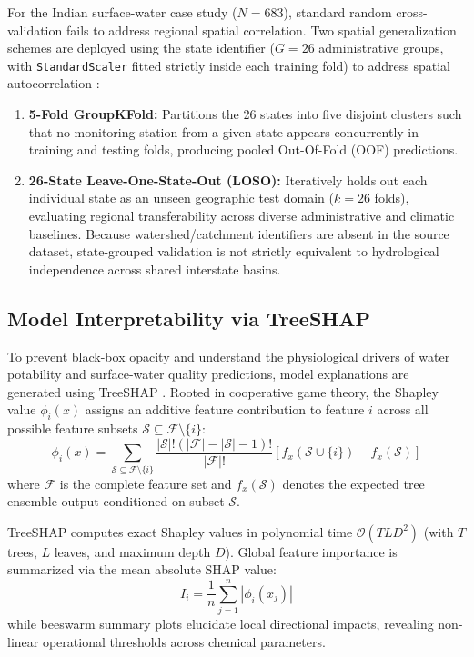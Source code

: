 \documentclass[pdflatex,sn-mathphys-num]{sn-jnl}%
\theoremstyle{thmstyleone}%
\theoremstyle{thmstyletwo}%
\theoremstyle{thmstylethree}%
\begin{document}
For the Indian surface-water case study ($N = 683$), standard random cross-validation fails to address regional spatial correlation. Two spatial generalization schemes are deployed using the state identifier ($G = 26$ administrative groups, with \texttt{StandardScaler} fitted strictly inside each training fold) to address spatial autocorrelation \cite{roberts2017,ploton2020,meyer2018}:
\begin{enumerate}
    \item \textbf{5-Fold GroupKFold:} Partitions the 26 states into five disjoint clusters such that no monitoring station from a given state appears concurrently in training and testing folds, producing pooled Out-Of-Fold (OOF) predictions.
    \item \textbf{26-State Leave-One-State-Out (LOSO):} Iteratively holds out each individual state as an unseen geographic test domain ($k = 26$ folds), evaluating regional transferability across diverse administrative and climatic baselines. Because watershed/catchment identifiers are absent in the source dataset, state-grouped validation is not strictly equivalent to hydrological independence across shared interstate basins.
\end{enumerate}

\subsection{Model Interpretability via TreeSHAP}\label{subsec4_7}

To prevent black-box opacity and understand the physiological drivers of water potability and surface-water quality predictions, model explanations are generated using TreeSHAP \cite{lundberg2017,lundberg2020,molnar2020}. Rooted in cooperative game theory, the Shapley value $\phi_i(x)$ assigns an additive feature contribution to feature $i$ across all possible feature subsets $\mathcal{S} \subseteq \mathcal{F} \setminus \{i\}$:
\begin{equation}
    \phi_i(x) = \sum_{\mathcal{S} \subseteq \mathcal{F} \setminus \{i\}} \frac{|\mathcal{S}|! (|\mathcal{F}| - |\mathcal{S}| - 1)!}{|\mathcal{F}|!} \left[ f_x(\mathcal{S} \cup \{i\}) - f_x(\mathcal{S}) \right]
    \label{eq:shap}
\end{equation}
where $\mathcal{F}$ is the complete feature set and $f_x(\mathcal{S})$ denotes the expected tree ensemble output conditioned on subset $\mathcal{S}$. 

TreeSHAP computes exact Shapley values in polynomial time $\mathcal{O}(T L D^2)$ (with $T$ trees, $L$ leaves, and maximum depth $D$). Global feature importance is summarized via the mean absolute SHAP value:
\begin{equation}
    I_i = \frac{1}{n} \sum_{j=1}^n |\phi_i(x_j)|
    \label{eq:shap_importance}
\end{equation}
while beeswarm summary plots elucidate local directional impacts, revealing non-linear operational thresholds across chemical parameters.
\end{document}
